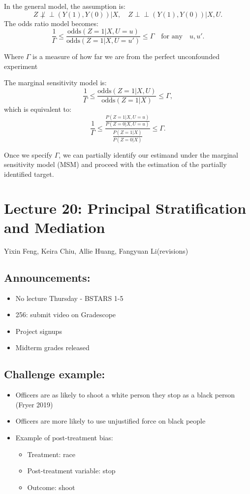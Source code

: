 In the general model, the assumption is:
\[
Z \not\perp\!\!\!\perp (Y(1), Y(0)) | X, \quad Z \perp\!\!\!\perp (Y(1), Y(0)) | X, U.
\]
The odds ratio model becomes:
\[
\frac{1}{\Gamma} \leq \frac{\text{odds}(Z=1 | X, U = u)}{\text{odds}(Z=1 | X, U = u')} \leq \Gamma \quad \text{for any} \quad u, u'.
\]

Where \(\Gamma\) is a measure of how far we are from the perfect unconfounded experiment

The marginal sensitivity model is:
\[
\frac{1}{\Gamma} \leq \frac{\text{odds}(Z=1 | X, U)}{\text{odds}(Z=1 | X)} \leq \Gamma,
\]
which is equivalent to:
\[
\frac{1}{\Gamma} \leq \frac{\frac{P(Z=1 | X, U=u)}{P(Z=0 | X, U=u)}}{\frac{P(Z=1 | X)}{P(Z=0 | X)}} \leq \Gamma.
\]

Once we specify \(\Gamma\), we can partially identify our estimand under the marginal sensitivity model (MSM) and proceed with the estimation of the partially identified target.

\section{Lecture 20: Principal Stratification and Mediation}{Yixin Feng, Keira Chiu, Allie Huang, Fangyuan Li(revisions)}
\subsection*{Announcements:}
\begin{itemize}
    \item No lecture Thursday - BSTARS 1-5
    \item 256: submit video on Gradescope
    \item Project signups
    \item Midterm grades released
\end{itemize}

\subsection*{Challenge example:}
\begin{itemize}
    \item Officers are as likely to shoot a white person they stop as a black person (Fryer 2019)
    \item Officers are more likely to use unjustified force on black people
    \item Example of post-treatment bias:
    \begin{itemize}
        \item Treatment: race
        \item Post-treatment variable: stop
        \item Outcome: shoot
    \end{itemize}
\end{itemize}

